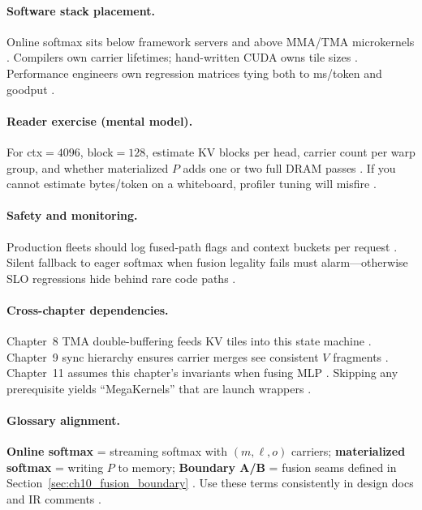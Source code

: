 \paragraph{Software stack placement.} Online softmax sits below framework servers and above MMA/TMA microkernels \citep{kwon2023vllm,semianalysis2024tma}. Compilers own carrier lifetimes; hand-written CUDA owns tile sizes \citep{chen2020compilerbasedhardw,yirage2026}. Performance engineers own regression matrices tying both to ms/token and goodput \citep{patel2025llminference,taxbreak2026}.

\paragraph{Reader exercise (mental model).} For ctx${=}4096$, block${=}128$, estimate KV blocks per head, carrier count per warp group, and whether materialized $P$ adds one or two full DRAM passes \citep{dao2022flashattention,memoryfloor2026}. If you cannot estimate bytes/token on a whiteboard, profiler tuning will misfire \citep{patel2025llminference,dlbook}.

\paragraph{Safety and monitoring.} Production fleets should log fused-path flags and context buckets per request \citep{kwon2023vllm,patel2025llminference}. Silent fallback to eager softmax when fusion legality fails must alarm---otherwise SLO regressions hide behind rare code paths \citep{yirage2026,memoryfloor2026,taxbreak2026}.

\paragraph{Cross-chapter dependencies.} Chapter~8 TMA double-buffering feeds KV tiles into this state machine \citep{semianalysis2024tma}. Chapter~9 sync hierarchy ensures carrier merges see consistent $V$ fragments \citep{amd2024aie,dao2023flashdecoding}. Chapter~11 assumes this chapter's invariants when fusing MLP \citep{taxbreak2026,yirage2026}. Skipping any prerequisite yields ``MegaKernels'' that are launch wrappers \citep{memoryfloor2026,nvidia2024cudagraphs}.

\paragraph{Glossary alignment.} \textbf{Online softmax} = streaming softmax with $(m,\ell,o)$ carriers; \textbf{materialized softmax} = writing $P$ to memory; \textbf{Boundary A/B} = fusion seams defined in Section~\ref{sec:ch10_fusion_boundary} \citep{dao2022flashattention,taxbreak2026}. Use these terms consistently in design docs and IR comments \citep{chen2020compilerbasedhardw,yirage2026}.


